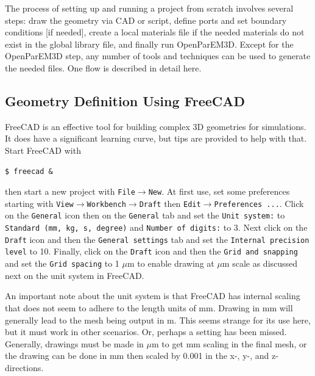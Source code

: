\documentclass[titlepage]{article}
\renewcommand\_{\textunderscore\linebreak[1]}
\begin{document}
The process of setting up and running a project from scratch involves several steps: draw the geometry via CAD or script, define ports and set boundary conditions [if needed], create a local materials file if the needed materials do not exist in the global library file, and finally run OpenParEM3D.  Except for the OpenParEM3D step, any number of tools and techniques can be used to generate the needed files.  One flow is described in detail here.

\subsection{Geometry Definition Using FreeCAD}
\label{sec:freecad}

FreeCAD is an effective tool for building complex 3D geometries for simulations.  It does have a significant learning curve, but tips are provided to help with that.  Start FreeCAD with
\begin{Verbatim}[fontsize=\small]
   $ freecad &
\end{Verbatim}
\noindent then start a new project with \texttt{File}$\rightarrow$\texttt{New}.
At first use, set some preferences starting with \newline \texttt{View}$\rightarrow$\texttt{Workbench}$\rightarrow$\texttt{Draft} then \texttt{Edit}$\rightarrow$\texttt{Preferences ...}.
Click on the \texttt{General} icon then on the \texttt{General} tab and set the \texttt{Unit system:} to \texttt{Standard (mm, kg, s, degree)} and \texttt{Number of digits:} to 3.
Next click on the \texttt{Draft} icon and then the \texttt{General settings} tab and set the \texttt{Internal precision level} to 10. Finally, click on the \texttt{Draft} icon and then the \texttt{Grid and snapping} and set the \texttt{Grid spacing} to 1 $\mu$m to enable drawing at $\mu$m scale as discussed next on the unit system in FreeCAD.

An important note about the unit system is that FreeCAD has internal scaling that does not seem to adhere to the length units of mm.  Drawing in mm will generally lead to the mesh being output in m.  This seems strange for its use here, but it must work in other scenarios.  Or, perhaps a setting has been missed.  Generally, drawings must be made in $\mu$m to get mm scaling in the final mesh, or the drawing can be done in mm then scaled by 0.001 in the x-, y-, and z- directions.
\end{document}
